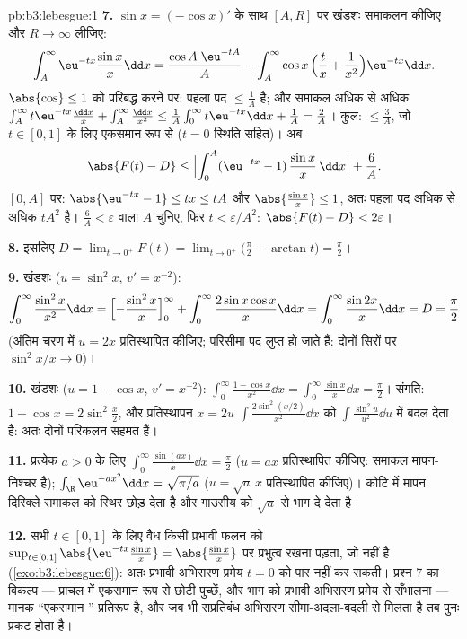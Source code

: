 \begin{solution}{pb:b3:lebesgue:1}
\textbf{7.} $\sin x =
(-\cos x)'$ के साथ $[A, R]$ पर खंडशः समाकलन कीजिए और $R \to \infty$ लीजिए:
\[
\int_A^{\infty}\eu^{-tx}\frac{\sin x}x\dd x
= \frac{\cos A\;\eu^{-tA}}{A}
- \int_A^\infty \cos x\,\Bigl(\frac tx +
\frac1{x^2}\Bigr)\eu^{-tx}\dd x .
\]
$\abs{\cos} \leq 1$ को परिबद्ध करने पर: पहला पद $\leq \frac1A$ है; और समाकल अधिक से अधिक
$\int_A^\infty t\eu^{-tx}\frac{\dd x}x
+ \int_A^\infty\frac{\dd x}{x^2} \leq \frac1A\int_0^\infty
t\eu^{-tx}\dd x + \frac1A = \frac2A$। कुल: $\leq \frac 3A$, जो $t \in [0, 1]$ के लिए एकसमान रूप से ($t = 0$ स्थिति सहित)।
अब
\[
\abs{F(t) - D} \leq
\Bigl|\int_0^A(\eu^{-tx} - 1)\,\frac{\sin x}x\,\dd x\Bigr| +
\frac6A .
\]
$[0, A]$ पर: $\abs{\eu^{-tx} - 1} \leq tx \leq tA$ और $\abs{\frac{\sin x}x} \leq 1$, अतः पहला पद अधिक से अधिक $tA^2$ है। $\frac6A < \varepsilon$
वाला $A$ चुनिए, फिर $t <
\varepsilon/A^2$: $\abs{F(t) - D} < 2\varepsilon$।

\textbf{8.} इसलिए $D = \lim_{t\to0^+}F(t) =
\lim_{t\to0^+}\bigl(\frac\pi2 - \arctan t\bigr) =
\frac\pi2$।

\textbf{9.} खंडशः ($u = \sin^2x$, $v' = x^{-2}$):
\[
\int_0^\infty\frac{\sin^2x}{x^2}\dd x
= \Bigl[-\frac{\sin^2x}{x}\Bigr]_0^\infty +
\int_0^\infty\frac{2\sin x\cos x}{x}\dd x
= \int_0^\infty\frac{\sin 2x}{x}\dd x = D = \frac\pi2
\]
(अंतिम चरण में $u = 2x$ प्रतिस्थापित कीजिए; परिसीमा पद लुप्त हो जाते
हैं: दोनों सिरों पर $\sin^2 x/x \to 0$)।

\textbf{10.} खंडशः ($u = 1 - \cos x$, $v' = x^{-2}$): $\int_0^\infty\frac{1 - \cos x}{x^2}\dd x =
\int_0^\infty\frac{\sin x}x\dd x = \frac\pi2$। संगति: $1 - \cos x = 2\sin^2\frac x2$, और प्रतिस्थापन
$x = 2u$ $\int\frac{2\sin^2(x/2)}{x^2}\dd x$ को $\int\frac{\sin^2u}{u^2}\dd u$ में बदल देता है: अतः दोनों परिकलन सहमत हैं।

\textbf{11.} प्रत्येक $a > 0$ के लिए $\int_0^\infty\frac{\sin(ax)}x\dd x = \frac\pi2$ ($u = ax$ प्रतिस्थापित कीजिए:
समाकल मापन-निश्चर है); $\int_\R\eu^{-ax^2}\dd x = \sqrt{\pi/a}$ ($u = \sqrt a\,x$ प्रतिस्थापित कीजिए)। कोटि में
मापन दिरिक्ले समाकल को स्थिर छोड़ देता है और गाउसीय को $\sqrt a$ से भाग
दे देता है।

\textbf{12.} सभी $t \in [0,1]$ के लिए वैध किसी प्रभावी फलन को $\sup_{t\in[0,1]}\abs{\eu^{-tx}\frac{\sin
x}x} = \abs{\frac{\sin x}x}$ पर
प्रभुत्व रखना पड़ता, जो  नहीं है (\cref{exo:b3:lebesgue:6}): अतः प्रभावी अभिसरण
प्रमेय $t = 0$ को पार नहीं कर सकती। प्रश्न 7 का विकल्प --- प्राचल में
एकसमान रूप से छोटी पुच्छें, और  भाग को प्रभावी अभिसरण प्रमेय से
सँभालना --- मानक ``एकसमान '' प्रतिरूप है, और जब भी सप्रतिबंध
अभिसरण सीमा-अदला-बदली से मिलता है तब पुनः प्रकट होता है।


\end{solution}
